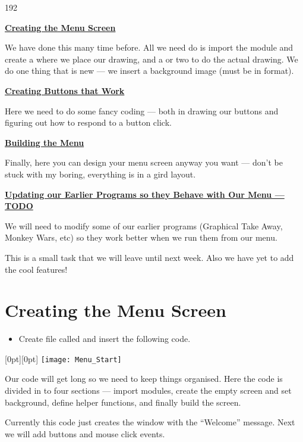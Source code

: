 \documentclass{coderdojo}
\newcommand\contentsitem[2]{
	\item \hyperref[#1]{\color{section}\bfseries #2}
}
\newcommand\TODO[1]{
\begin{itemize}
\item[\todoSymbol] \color{todo} #1
\end{itemize}}
\begin{document}
\begin{dingautolist}{192} 
\contentsitem{screen}{Creating the Menu Screen}

We have done this many time before. All we need do is import the  module and create a  where we place our drawing, and a  or two to do the actual drawing.  We do one thing that is new --- we insert a background image (must be in  format).

\contentsitem{button}{Creating Buttons that Work}

Here we need to do some fancy coding --- both in drawing our buttons and figuring out how to respond to a button click.  

\contentsitem{take_away}{Building the Menu}

Finally, here you can design your menu screen anyway you want --- don't be stuck with my boring, everything is in a gird layout.

\contentsitem{button}{Updating our Earlier Programs so they Behave with Our Menu --- TODO}

We will need to modify some of our earlier programs (Graphical Take Away, Monkey Wars, etc) so they work better when we run them from our menu.  

This is a small task that we will leave until next week. Also we have yet to add the cool features!

\end{dingautolist}

\clearpage
\section{Creating the Menu Screen}\label{sec:screen}

\TODO{Create file called  and insert the following code.}

\mbox{}\hfill\raisebox{4cm}[0pt][0pt]{%
	\texttt{[image: Menu\_Start]}
}\hspace*{-1.5cm}

Our code will get long so we need to keep things organised. Here the code is divided in to four sections --- import modules, create the empty screen and set background, define helper functions, and finally build the screen.

Currently this code just creates the window with the ``Welcome'' message. Next we will add buttons and mouse click events.
\clearpage
\end{document}
